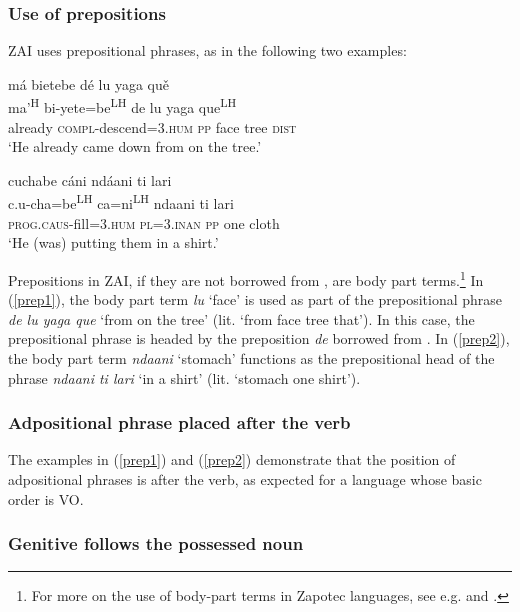 \subsubsection{Use of prepositions}

ZAI uses prepositional phrases, as in the following two examples:

\ea\label{prep1}
\glll má bietebe dé lu yaga qu\v{e} \\
ma'\textsuperscript{H} bi-yete=be\textsuperscript{LH} de lu yaga que\textsuperscript{LH} \\
already \textsc{compl}-descend=\textsc{3.hum} \textsc{pp} face tree \textsc{dist} \\
\glt `He already came down from on the tree.' 
\z

\ea\label{prep2}
\glll cuchabe cáni ndáani ti lari \\
c.u-cha=be\textsuperscript{LH} ca=ni\textsuperscript{LH} ndaani ti lari \\
\textsc{prog.caus}-fill=\textsc{3.hum} \textsc{pl=3.inan} \textsc{pp} one cloth \\
\glt `He (was) putting them in a shirt.'		
\z

Prepositions in ZAI, if they are not borrowed from , are body part terms.\footnote{For more on the use of body-part terms in Zapotec languages, see e.g. \citet{maclaury1989} and \citet{perez2011b}.} In (\ref{prep1}), the body part term \textit{lu} `face' is used as part of the prepositional phrase \textit{de lu yaga que} `from on the tree' (lit. `from face tree that'). In this case, the prepositional phrase is headed by the preposition \textit{de} borrowed from . In (\ref{prep2}), the body part term \textit{ndaani} `stomach' functions as the prepositional head of the phrase \textit{ndaani ti lari} `in a shirt' (lit. `stomach one shirt').


\subsubsection{Adpositional phrase placed after the verb}

The examples in (\ref{prep1}) and (\ref{prep2}) demonstrate that the position of adpositional phrases is after the verb, as expected for a language whose basic order is VO.



\subsubsection{Genitive follows the possessed noun}

